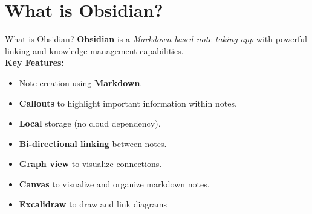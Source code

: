 \documentclass[10pt, xcolor=dvipsnames]{beamer}
\begin{document}
	\newpage
	\section{What is Obsidian?}
	\begin{frame}{What is Obsidian?}
		\textcolor{obsidian}{\bf Obsidian} is a \underline{\textit{Markdown-based note-taking app}} with powerful linking and knowledge management capabilities.\\
		\vspace{0.5cm}
		\textbf{Key Features:}
		\begin{itemize}
			\item Note creation using \textbf{Markdown}.
			\item \textbf{Callouts} to highlight important information within notes.
			\item \textbf{Local} storage (no cloud dependency).
			\item \textbf{Bi-directional linking} between notes.
			\item \textbf{Graph view} to visualize connections.
			\item \textbf{Canvas} to visualize and organize markdown notes.
			\item \textbf{Excalidraw} to draw and link diagrams 
		\end{itemize}
	\end{frame}
	
\end{document}
